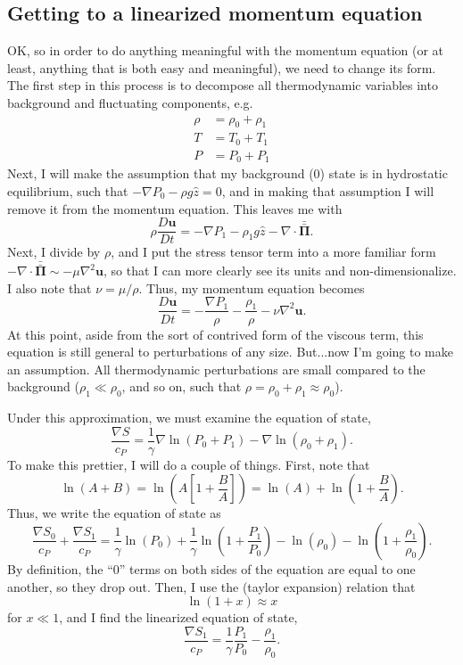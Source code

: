 \documentclass[aps, pre, onecolumn, nofootinbib, notitlepage, groupedaddress, amsfonts, amssymb, amsmath, longbibliography]{revtex4-1}
\newcommand{\grad}{\ensuremath{\nabla}}
\newcommand{\stressT}{\ensuremath{\bm{\bar{\bar{\Pi}}}}}
\begin{document}
\subsection{Getting to a linearized momentum equation}
OK, so in order to do anything meaningful with the momentum equation (or at least, anything
that is both easy and meaningful), we need to change its form.  The first step in this process
is to decompose all thermodynamic variables into background and fluctuating components, e.g.
\begin{equation}
\begin{split}
\rho &= \rho_0 + \rho_1 \\
T &= T_0 + T_1 \\
P &= P_0 + P_1
\end{split}
\end{equation}
Next, I will make the assumption that my background (0) state is in hydrostatic equilibrium,
such that $-\grad P_0 - \rho g \hat{z} = 0$, and in making that assumption I will remove it
from the momentum equation.  This leaves me with
\begin{equation}
\rho \frac{D\bm{u}}{Dt} = -\grad P_1 - \rho_1 g \hat{z} - \grad\cdot\stressT.
\end{equation}
Next, I divide by $\rho$, and I put the stress tensor term into a more familiar form
$-\grad\cdot\stressT \sim -\mu \grad^2 \bm{u}$, so that I can more clearly see its
units and non-dimensionalize.  I also note that $\nu = \mu / \rho$.  Thus, my momentum
equation becomes
\begin{equation}
\frac{D \bm{u}}{Dt} = -\frac{\grad P_1}{\rho} - \frac{\rho_1}{\rho} - \nu \grad^2 \bm{u}.
\end{equation}
At this point, aside from the sort of contrived form of the viscous term, this equation is
still general to perturbations of any size.  But...now I'm going to make an assumption. All
thermodynamic perturbations are small compared to the background ($\rho_1 \ll \rho_0$,
and so on, such that $\rho = \rho_0 + \rho_1 \approx \rho_0$).

Under this approximation, we must examine the equation of state,
\begin{equation}
\frac{\grad S}{c_P} = \frac{1}{\gamma}\grad\ln(P_0 + P_1) - \grad \ln (\rho_0 + \rho_1).
\end{equation}
To make this prettier, I will do a couple of things.  First, note that
$$
\ln (A + B) = \ln\left(A\left[1 + \frac{B}{A}\right]\right) = \ln(A) + \ln\left(1 + \frac{B}{A}\right).
$$
Thus, we write the equation of state as
\begin{equation}
\frac{\grad S_0}{c_P} + \frac{\grad S_1}{c_P} = \frac{1}{\gamma}\ln(P_0) + \frac{1}{\gamma}\ln\left(1 + \frac{P_1}{P_0}\right)
- \ln(\rho_0) - \ln\left(1 + \frac{\rho_1}{\rho_0}\right).
\end{equation}
By definition, the ``0'' terms on both sides of the equation are equal to one another, so they
drop out.  Then, I use the (taylor expansion) relation that
$$
\ln(1 + x) \approx x
$$
for $x \ll 1$, and I find the linearized equation of state,
\begin{equation}
\boxed{
\frac{\grad S_1}{c_P} = \frac{1}{\gamma} \frac{P_1}{P_0} - \frac{\rho_1}{\rho_0}
}.
\end{equation}



\end{document}
